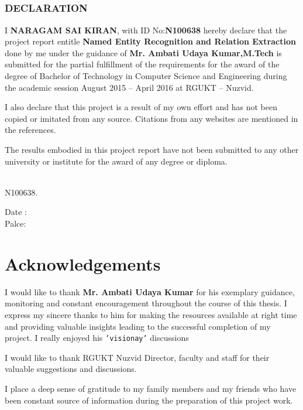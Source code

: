 \documentclass[12pt]{report}
\newcommand*{\Signature}[1]{
	\vspace{3cm}
    \par\noindent\makebox[5cm]{\hrulefill}
    \par\noindent\makebox[5cm][l]{#1}
}
\begin{document}
\section*{}
\thispagestyle{fancy}
\begin{center}\makebox[15cm]{\hrulefill}\end{center}
\vspace{1cm}
\begin{center}
\subsection*{DECLARATION\\\makebox[5cm]{\hrulefill}}

\end{center}
\par I \textbf{NARAGAM SAI KIRAN}, with ID No:\textbf{N100638} hereby declare that the
 project report entitle \textbf{Named Entity Recognition and Relation Extraction} done by me
 under the guidance of \textbf{Mr. Ambati Udaya Kumar,M.Tech} is submitted for the partial
  fulfillment of the requirements for the award of the degree of Bachelor of Technology
   in Computer Science and Engineering during the academic session August 2015 – April 2016 at RGUKT – Nuzvid.

\par I also declare that this project is a result of my own effort and has not been copied or imitated from any source.
 Citations from any websites are mentioned in the references.
\par The results embodied in this project report have not been submitted to any other university or institute for the award of any degree or diploma.

\Signature{N. SAI KIRAN,}\\N100638.\\
\begin{flushright}
Date : \makebox[3cm]{\hrulefill}\\
Palce: \makebox[3cm]{\hrulefill}\\
\end{flushright}
\pagebreak

\chapter*{Acknowledgements}
\par I would like to thank \textbf{Mr. Ambati Udaya Kumar} for his exemplary guidance, monitoring and constant encouragement throughout the course of this thesis.
	I express my sincere thanks to him for making the resources available at right time and providing valuable insights leading to the successful completion of my project.
I really enjoyed his \texttt{'visionay'} discussions
	\par I would like to thank RGUKT Nuzvid Director, faculty and staff for their valuable suggestions and discussions.
	\par I place a deep sense of gratitude to my family members and my friends who have been constant source of information during the preparation of this project work.
\end{document}

